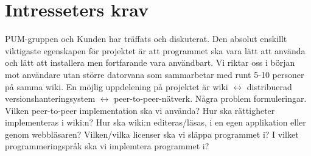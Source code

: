 \section{Intresseters krav}
PUM-gruppen och Kunden har träffats och diskuterat. Den absolut enskillt viktigaste egenskapen för projektet är att programmet ska vara lätt att använda och lätt att installera men fortfarande vara användbart.  Vi riktar oss i början mot användare utan större datorvana som sammarbetar med runt 5-10 personer på samma wiki. En möjlig uppdelening på projektet är wiki $\leftrightarrow$ distribuerad versionshanteringsystem $\leftrightarrow$ peer-to-peer-nätverk. Några problem formuleringar. Vilken peer-to-peer implementation ska vi använda? Hur ska rättigheter implementeras i wiki:n? Hur ska wiki:n editeras/läsas, i en egen applikation eller genom webbläsaren? Vilken/vilka licenser ska vi släppa programmet i? I vilket programmeringspråk ska vi implemtera programmet i?


